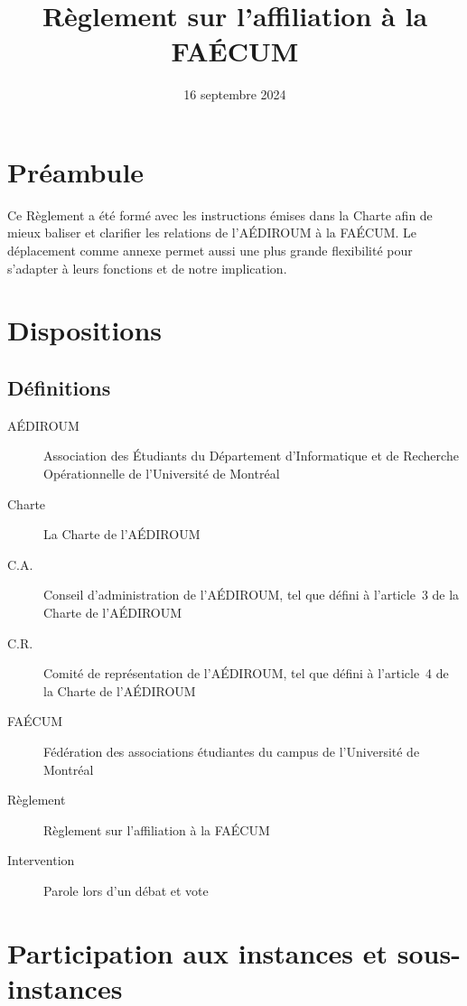 \documentclass{aediroum}
\title{Règlement sur l'affiliation à la FAÉCUM}
\date{16 septembre 2024}
\begin{document}
\maketitle

\section{Préambule}\label{sec:preambule}

Ce Règlement a été formé avec les instructions émises dans la Charte afin de mieux baliser et clarifier les relations de l'AÉDIROUM à la FAÉCUM. Le déplacement comme annexe permet aussi une plus grande flexibilité pour s'adapter à leurs fonctions et de notre implication.

\section{Dispositions}\label{sec:dispositions}

\subsection{Définitions}\label{sec:definitions}

\begin{description}
    \item[AÉDIROUM] Association des Étudiants du Département d'Informatique et de Recherche Opérationnelle de l'Université de Montréal
    \item[Charte] La Charte de l'AÉDIROUM
    \item[C.A.] Conseil d'administration de l'AÉDIROUM, tel que défini à l'article~3 de la Charte de l'AÉDIROUM
    \item[C.R.] Comité de représentation de l'AÉDIROUM, tel que défini à l'article~4 de la Charte de l'AÉDIROUM
    \item[FAÉCUM] Fédération des associations étudiantes du campus de l'Université de Montréal
    \item[Règlement] Règlement sur l'affiliation à la FAÉCUM
    \item[Intervention] Parole lors d'un débat et vote
\end{description}

\section{Participation aux instances et sous-instances}\label{sec:hierarchie-delegues-faecum}
\end{document}
